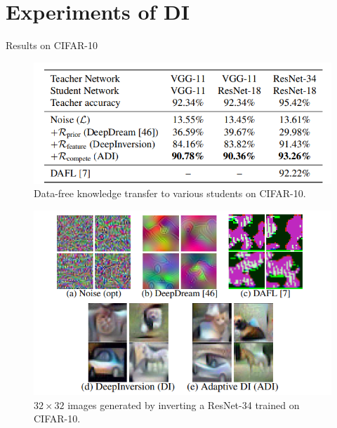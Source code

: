 \documentclass{beamer}
\begin{document}
\section{Experiments of DI} 
\begin{frame}{Results on CIFAR-10}
    \begin{figure}
        \centering
        \includegraphics[scale=0.45]{images/distill_3.png}
        \caption{Data-free knowledge transfer to various students on
CIFAR-10.}
    \end{figure}
    \begin{figure}
        \centering
        \includegraphics[scale=0.45]{images/distill_5.png}
        \caption{$32 \times 32$ images generated by inverting a ResNet-34
trained on CIFAR-10.}
        \label{fig:enter-label}
    \end{figure}
\end{frame}
\end{document}
